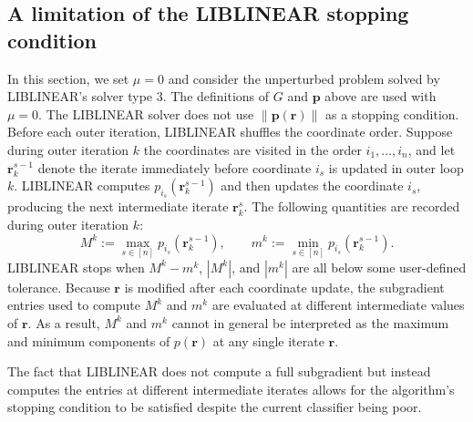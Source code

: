 \documentclass[twoside,11pt]{article}
\newcommand\p{\bm{p}}
\renewcommand\r{\bm{r}}
\begin{document}
    \subsection{A limitation of the LIBLINEAR stopping condition} \label{sec:ll-stop-limitation}
    In this section, we set $\mu = 0$ and consider the unperturbed problem solved by LIBLINEAR's solver type $3$. The definitions of $G$ and $\p$ above are used with $\mu = 0$. The LIBLINEAR solver does not use $\|\p(\r)\|$ as a stopping condition. Before each outer iteration, LIBLINEAR shuffles the coordinate order. Suppose during outer iteration $k$ the coordinates are visited in the order $i_1,\hdots,i_n$, and let $\r_k^{s-1}$ denote the iterate immediately before coordinate $i_s$ is updated in outer loop $k$. LIBLINEAR computes $p_{i_s}(\r_k^{s-1})$ and then updates the coordinate $i_s$, producing the next intermediate iterate $\r_k^s$. The following quantities are recorded during outer iteration $k$:
    \[
        M^k := \max_{s \in [n]} p_{i_s}(\r_k^{s-1}),\qquad m^k := \min_{s \in [n]} p_{i_s}(\r_k^{s-1}).
    \]
    LIBLINEAR stops when $M^k - m^k$, $|M^k|$, and $|m^k|$ are all below some user-defined tolerance. Because $\r$ is modified after each coordinate update, the subgradient entries used to compute $M^k$ and $m^k$ are evaluated at different intermediate values of $\r$. As a result, $M^k$ and $m^k$ cannot in general be interpreted as the maximum and minimum components of $p(\r)$ at any single iterate $\r$.
    
    The fact that LIBLINEAR does not compute a full subgradient but instead computes the entries at different intermediate iterates allows for the algorithm's stopping condition to be satisfied despite the current classifier being poor.
\end{document}
